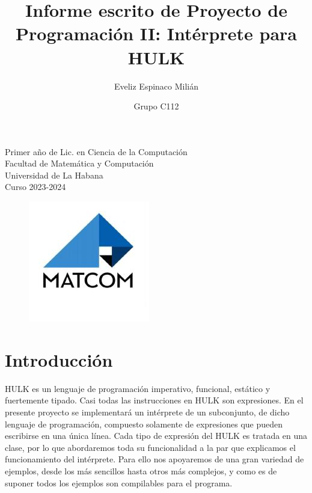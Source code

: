 \documentclass[12pt, letterpaper]{article}
\title{\textbf{Informe escrito de Proyecto de Programación II: Intérprete para HULK} }
\author{Eveliz Espinaco Milián}
\date{Grupo C112}
\begin{document}
\thispagestyle{empty} 
\maketitle

\vspace{4cm}
\begin{center}
    Primer año de Lic. en Ciencia de la Computación \\ Facultad de Matemática y Computación \\ Universidad de La Habana \\ Curso 2023-2024
\end{center}

\begin{figure}[h]
    \centering
    \includegraphics[scale= 0.53]{R.jpg}
\end{figure}

\newpage

\tableofcontents
\newpage

\section{Introducción}

HULK es un lenguaje de programación imperativo, funcional, estático y fuertemente tipado. Casi todas las instrucciones en HULK son expresiones. En el presente 
proyecto se implementará un intérprete de un subconjunto, de dicho lenguaje de programación,  compuesto solamente de expresiones que pueden escribirse en una 
única línea. Cada tipo de expresión del HULK es tratada en una clase, por lo que abordaremos toda su funcionalidad a la par que explicamos el funcionamiento del 
intérprete. Para ello nos apoyaremos de una gran variedad de ejemplos, desde los más sencillos hasta otros más complejos, y como es de suponer todos los ejemplos 
son compilables para el programa.
\newpage
\end{document}
